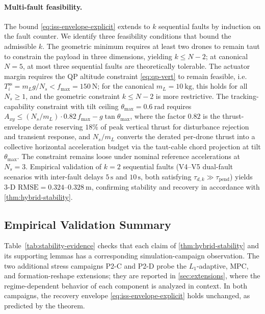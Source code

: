 \paragraph{Multi-fault feasibility.} The bound \eqref{eq:iss-envelope-explicit} extends to $k$ sequential faults by induction on the fault counter. We identify three feasibility conditions that bound the admissible $k$. The geometric minimum requires at least two drones to remain taut to constrain the payload in three dimensions, yielding $k \le N - 2$; at canonical $N = 5$, at most three sequential faults are theoretically tolerable. The actuator margin requires the QP altitude constraint \eqref{eq:qp-vert} to remain feasible, i.e.\ $T_i^{\mathrm{ss}} = m_L g/N_s < f_{\max} = \SI{150}{\newton}$; for the canonical $m_L = \SI{10}{\kilo\gram}$, this holds for all $N_s \ge 1$, and the geometric constraint $k \le N-2$ is more restrictive. The tracking-capability constraint with tilt ceiling $\theta_{\max} = \SI{0.6}{\radian}$ requires $A_{xy} \le (N_s/m_L)\cdot 0.82\, f_{\max} - g\tan\theta_{\max}$, where the factor $0.82$ is the thrust-envelope derate reserving $18\%$ of peak vertical thrust for disturbance rejection and transient response, and $N_s/m_L$ converts the derated per-drone thrust into a collective horizontal acceleration budget via the taut-cable chord projection at tilt $\theta_{\max}$. The constraint remains loose under nominal reference accelerations at $N_s = 3$. Empirical validation of $k = 2$ sequential faults (V4--V5 dual-fault scenarios with inter-fault delays $5\,\mathrm{s}$ and $10\,\mathrm{s}$, both satisfying $\tau_{d,k} \gg \tau_{\mathrm{pend}}$) yields 3-D $\mathrm{RMSE} = 0.324$--$\SI{0.328}{\metre}$, confirming stability and recovery in accordance with \cref{thm:hybrid-stability}.

\subsection{Empirical Validation Summary}
\label{sec:stability-empirical-validation}

Table~\ref{tab:stability-evidence} checks that each claim of \cref{thm:hybrid-stability} and its supporting lemmas has a corresponding simulation-campaign observation. The two additional stress campaigns P2-C and P2-D probe the $L_1$-adaptive, MPC, and formation-reshape extensions; they are reported in \cref{sec:extensions}, where the regime-dependent behavior of each component is analyzed in context. In both campaigns, the recovery envelope \eqref{eq:iss-envelope-explicit} holds unchanged, as predicted by the theorem.

